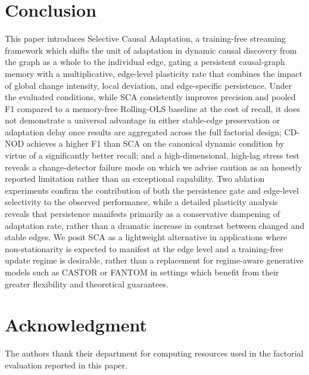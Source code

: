 \documentclass{ieeeaccess}
\begin{document}
\section{Conclusion}
\label{sec:conclusion}
This paper introduces Selective Causal Adaptation, a training-free streaming framework which shifts the unit of adaptation in dynamic causal discovery from the graph as a whole to the individual edge, gating a persistent causal-graph memory with a multiplicative, edge-level plasticity rate that combines the impact of global change intensity, local deviation, and edge-specific persistence. Under the evaluated conditions, while SCA consistently improves precision and pooled F1 compared to a memory-free Rolling-OLS baseline at the cost of recall, it does not demonstrate a universal advantage in either stable-edge preservation or adaptation delay once results are aggregated across the full factorial design; CD-NOD achieves a higher F1 than SCA on the canonical dynamic condition by virtue of a significantly better recall; and a high-dimensional, high-lag stress test reveals a change-detector failure mode on which we advise caution as an honestly reported limitation rather than an exceptional capability. Two ablation experiments confirm the contribution of both the persistence gate and edge-level selectivity to the observed performance, while a detailed plasticity analysis reveals that persistence manifests primarily as a conservative dampening of adaptation rate, rather than a dramatic increase in contrast between changed and stable edges. We posit SCA as a lightweight alternative in applications where non-stationarity is expected to manifest at the edge level and a training-free update regime is desirable, rather than a replacement for regime-aware generative models such as CASTOR or FANTOM in settings which benefit from their greater flexibility and theoretical guarantees.

\section*{Acknowledgment}
The authors thank their department for computing resources used in the factorial evaluation reported in this paper.
\end{document}
